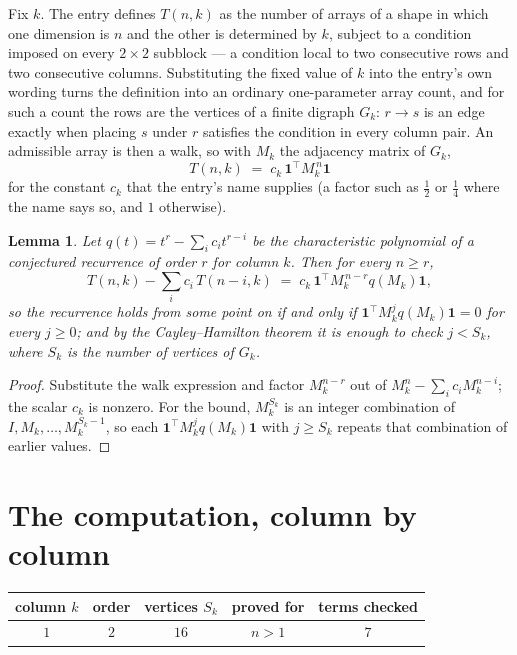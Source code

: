 \documentclass[11pt,a4paper]{article}
\theoremstyle{plain}
\newtheorem{lemma}[theorem]{Lemma}
\theoremstyle{definition}
\begin{document}
Fix $k$. The entry defines $T(n,k)$ as the number of arrays of a shape in which one dimension
is $n$ and the other is determined by $k$, subject to a condition imposed on every
$2\times2$ subblock --- a condition local to two consecutive rows and two consecutive columns.
Substituting the fixed value of $k$ into the entry's own wording turns the definition into an
ordinary one-parameter array count, and for such a count the rows are the vertices of a finite
digraph $G_k$: $r\to s$ is an edge exactly when placing $s$ under $r$ satisfies the condition
in every column pair. An admissible array is then a walk, so with $M_k$ the adjacency matrix
of $G_k$,
\[
T(n,k)\;=\;c_k\,\mathbf{1}^{\!\top}M_k^{\,n}\mathbf{1}
\]
for the constant $c_k$ that the entry's name supplies (a factor such as $\tfrac12$ or
$\tfrac14$ where the name says so, and $1$ otherwise).

\begin{lemma}\label{lem:crit}
Let $q(t)=t^{r}-\sum_i c_it^{r-i}$ be the characteristic polynomial of a conjectured
recurrence of order $r$ for column $k$. Then for every $n\ge r$,
\[
T(n,k)-\sum_i c_i\,T(n-i,k)\;=\;c_k\,\mathbf{1}^{\!\top}M_k^{\,n-r}q(M_k)\mathbf{1},
\]
so the recurrence holds from some point on if and only if
$\mathbf{1}^{\!\top}M_k^{j}q(M_k)\mathbf{1}=0$ for every $j\ge0$; and by the
Cayley--Hamilton theorem it is enough to check $j<S_k$, where $S_k$ is the number of vertices
of $G_k$.
\end{lemma}

\begin{proof}
Substitute the walk expression and factor $M_k^{n-r}$ out of $M_k^{n}-\sum_ic_iM_k^{n-i}$;
the scalar $c_k$ is nonzero. For the bound, $M_k^{S_k}$ is an integer combination of
$I,M_k,\dots,M_k^{S_k-1}$, so each $\mathbf{1}^{\!\top}M_k^{j}q(M_k)\mathbf{1}$ with
$j\ge S_k$ repeats that combination of earlier values.
\end{proof}

\section{The computation, column by column}

\begin{center}
\begin{tabular}{ccccc}
column $k$ & order & vertices $S_k$ & proved for & terms checked \\ \hline
$1$ & $2$ & $16$ & $n>1$ & $7$ \\
\end{tabular}
\end{center}
\end{document}
